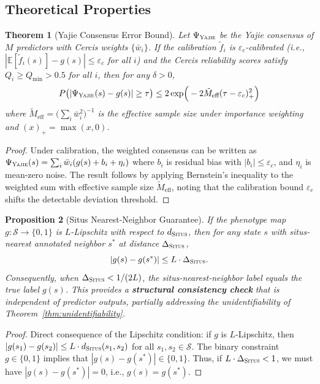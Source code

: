 \documentclass[11pt,a4paper]{article}
\newtheorem{theorem}{Theorem}[section]
\newtheorem{proposition}[theorem]{Proposition}
\theoremstyle{definition}
\newcommand{\E}{\mathbb{E}}
\newcommand{\calS}{\mathcal{S}}
\newcommand{\situs}{\textsc{Situs}}
\newcommand{\yajie}{\textsc{Yajie}}
\newcommand{\consensus}{\Psi}
\begin{document}
\subsection{Theoretical Properties}
\begin{theorem}[Yajie Consensus Error Bound]
\label{thm:yajie-error}
Let $\consensus_{\yajie}$ be the Yajie consensus of $M$ predictors with Cercis weights $\{\bar{w}_i\}$.
If the calibration $\tilde{f}_i$ is $\varepsilon_c$-calibrated (i.e., $|\E[\tilde{f}_i(s)] - g(s)| \leq \varepsilon_c$ for all $i$) and the Cercis reliability scores satisfy $Q_i \geq Q_{\min} > 0.5$ for all $i$, then for any $\delta > 0$,
\begin{equation}
    P\big(|\consensus_{\yajie}(s) - g(s)| \geq \tau\big) \leq 2\exp\!\Big(-2 \tilde{M}_{\text{eff}} (\tau - \varepsilon_c)_+^2\Big)
\end{equation}
where $\tilde{M}_{\text{eff}} = \big(\sum_i \bar{w}_i^2\big)^{-1}$ is the effective sample size under importance weighting and $(x)_+ = \max(x, 0)$.
\end{theorem}
\begin{proof}
Under calibration, the weighted consensus can be written as $\consensus_{\yajie}(s) = \sum_i \bar{w}_i (g(s) + b_i + \eta_i)$ where $b_i$ is residual bias with $|b_i| \leq \varepsilon_c$, and $\eta_i$ is mean-zero noise.
The result follows by applying Bernstein's inequality to the weighted sum with effective sample size $\tilde{M}_{\text{eff}}$, noting that the calibration bound $\varepsilon_c$ shifts the detectable deviation threshold.
\end{proof}
\begin{proposition}[Situs Nearest-Neighbor Guarantee]
\label{prop:situs-guarantee}
If the phenotype map $g: \calS \to \{0,1\}$ is $L$-Lipschitz with respect to $d_{\situs}$, then for any state $s$ with situs-nearest annotated neighbor $s^*$ at distance $\Delta_{\situs}$,
\begin{equation}
    |g(s) - g(s^*)| \leq L \cdot \Delta_{\situs}.
\end{equation}
Consequently, when $\Delta_{\situs} < 1/(2L)$, the situs-nearest-neighbor label equals the true label $g(s)$.
This provides a \textbf{structural consistency check} that is independent of predictor outputs, partially addressing the unidentifiability of Theorem~\ref{thm:unidentifiability}.
\end{proposition}
\begin{proof}
Direct consequence of the Lipschitz condition: if $g$ is $L$-Lipschitz, then $|g(s_1) - g(s_2)| \leq L \cdot d_{\situs}(s_1, s_2)$ for all $s_1, s_2 \in \calS$.
The binary constraint $g \in \{0,1\}$ implies that $|g(s) - g(s^*)| \in \{0, 1\}$.
Thus, if $L \cdot \Delta_{\situs} < 1$, we must have $|g(s) - g(s^*)| = 0$, i.e., $g(s) = g(s^*)$.
\end{proof}
\end{document}
